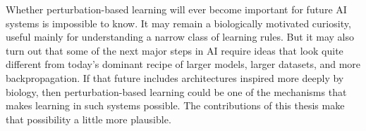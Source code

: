 Whether perturbation-based learning will ever become important for future AI systems is impossible to know. It may remain a biologically motivated curiosity, useful mainly for understanding a narrow class of learning rules. But it may also turn out that some of the next major steps in AI require ideas that look quite different from today’s dominant recipe of larger models, larger datasets, and more backpropagation. If that future includes architectures inspired more deeply by biology, then perturbation-based learning could be one of the mechanisms that makes learning in such systems possible. The contributions of this thesis make that possibility a little more plausible.